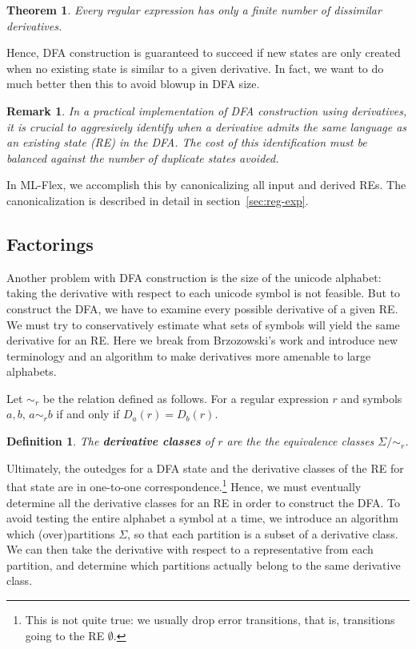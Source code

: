 \documentclass[11pt]{article}
\newcommand{\flex}{ML-Flex}
\newcommand{\RE}{r}
\newcommand{\New}[1]{\emph{\textbf{#1}}}
\newtheorem*{theorem}{Theorem}
\newtheorem*{definition}{Definition}
\newtheorem*{remark}{Remark}
\begin{document}
\begin{theorem} Every regular expression has only a finite number of dissimilar derivatives.
\end{theorem}

Hence, DFA construction is guaranteed to succeed if new states are only created when no existing state is similar to a given derivative.  In fact, we want to do much better then this to avoid blowup in DFA size.

\begin{remark}
In a practical implementation of DFA construction using derivatives, it is crucial to aggresively identify when a derivative admits the same language as an existing state (RE) in the DFA.  The cost of this identification must be balanced against the number of duplicate states avoided.
\end{remark}

In \flex{}, we accomplish this by canonicalizing all input and derived REs.  The canonicalization is described in detail in section~\ref{sec:reg-exp}.

\subsection{Factorings}\label{sec:factorings}

Another problem with DFA construction is the size of the unicode alphabet: taking the derivative with respect to each unicode symbol is not feasible.  But to construct the DFA, we have to examine every possible derivative of a given RE.  We must try to conservatively estimate what sets of symbols will yield the same derivative for an RE.  Here we break from Brzozowski's work and introduce new terminology and an algorithm to make derivatives more amenable to large alphabets.

Let $\sim_\RE$ be the relation defined as follows.  For a regular expression $\RE$ and symbols $a, b$, $a \sim_\RE b$ if and only if $D_a (\RE) = D_b (\RE)$.

\begin{definition}
The \New{derivative classes} of $\RE$ are the the equivalence classes $\Sigma/{\sim_\RE}$.
\end{definition}

Ultimately, the outedges for a DFA state and the derivative classes of the RE for that state are in one-to-one correspondence.\footnote{This is not quite true: we usually drop error transitions, that is, transitions going to the RE $\emptyset$.}   Hence, we must eventually determine all the derivative classes for an RE in order to construct the DFA.  To avoid testing the entire alphabet a symbol at a time, we introduce an algorithm which (over)partitions $\Sigma$, so that each partition is a subset of a derivative class.   We can then take the derivative with respect to a representative from each partition, and determine which partitions actually belong to the same derivative class.
\end{document}
